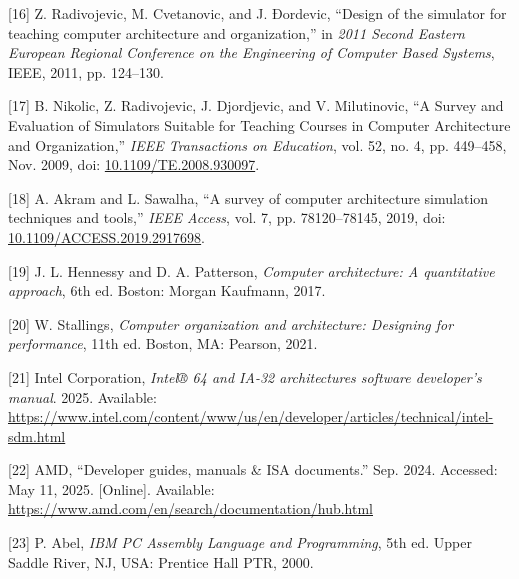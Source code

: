 \documentclass[12pt,oneside]{templates/unerthesis}
\newcommand{\CSLLeftMargin}[1]{#1} %
\newcommand{\CSLRightInline}[1]{#1} %
\newlength{\cslhangindent}
\newenvironment{CSLReferences}[2] %
 {\setlength{\parindent}{0pt}%
  \setlength{\leftskip}{#1 pt\relax}%
  \setlength{\parskip}{#2 pt\relax}%
  \everypar{\setlength{\hangindent}{\cslhangindent}}}
 {\par}
\begin{document}
\begin{CSLReferences}{0}{0}
\leavevmode{}%
\CSLLeftMargin{{[}16{]} }%
\CSLRightInline{Z. Radivojevic, M. Cvetanovic, and J. Ðordevic, {``Design of the simulator for teaching computer architecture and organization,''} in \emph{2011 {Second} {Eastern} {European} {Regional} {Conference} on the {Engineering} of {Computer} {Based} {Systems}}, IEEE, 2011, pp. 124--130.}

\leavevmode{}%
\CSLLeftMargin{{[}17{]} }%
\CSLRightInline{B. Nikolic, Z. Radivojevic, J. Djordjevic, and V. Milutinovic, {``A {Survey} and {Evaluation} of {Simulators} {Suitable} for {Teaching} {Courses} in {Computer} {Architecture} and {Organization},''} \emph{IEEE Transactions on Education}, vol. 52, no. 4, pp. 449--458, Nov. 2009, doi: \href{https://doi.org/10.1109/TE.2008.930097}{10.1109/TE.2008.930097}.}

\leavevmode{}%
\CSLLeftMargin{{[}18{]} }%
\CSLRightInline{A. Akram and L. Sawalha, {``A survey of computer architecture simulation techniques and tools,''} \emph{IEEE Access}, vol. 7, pp. 78120--78145, 2019, doi: \href{https://doi.org/10.1109/ACCESS.2019.2917698}{10.1109/ACCESS.2019.2917698}.}

\leavevmode{}%
\CSLLeftMargin{{[}19{]} }%
\CSLRightInline{J. L. Hennessy and D. A. Patterson, \emph{Computer architecture: A quantitative approach}, 6th ed. Boston: Morgan Kaufmann, 2017.}

\leavevmode{}%
\CSLLeftMargin{{[}20{]} }%
\CSLRightInline{W. Stallings, \emph{Computer organization and architecture: Designing for performance}, 11th ed. Boston, MA: Pearson, 2021.}

\leavevmode{}%
\CSLLeftMargin{{[}21{]} }%
\CSLRightInline{Intel Corporation, \emph{Intel® 64 and IA-32 architectures software developer's manual}. 2025. Available: \url{https://www.intel.com/content/www/us/en/developer/articles/technical/intel-sdm.html}}

\leavevmode{}%
\CSLLeftMargin{{[}22{]} }%
\CSLRightInline{AMD, {``Developer guides, manuals \& ISA documents.''} Sep. 2024. Accessed: May 11, 2025. {[}Online{]}. Available: \url{https://www.amd.com/en/search/documentation/hub.html}}

\leavevmode{}%
\CSLLeftMargin{{[}23{]} }%
\CSLRightInline{P. Abel, \emph{{IBM} {PC} {Assembly} {Language} and {Programming}}, 5th ed. Upper Saddle River, NJ, USA: Prentice Hall PTR, 2000.}


\end{CSLReferences}
\end{document}
